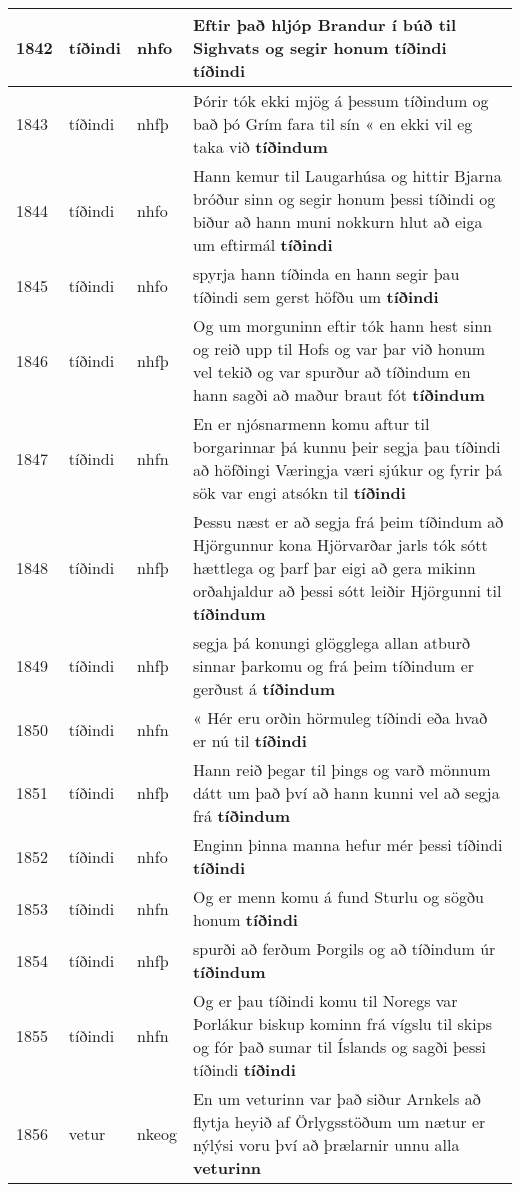 \documentclass{article}
\begin{document}
\begin{longtable}{p{1cm}|p{1cm}|p{1cm}|p{13cm}}
\hline
1842&tíðindi&nhfo&Eftir það hljóp Brandur í búð til Sighvats og segir honum tíðindi \textbf{tíðindi} \\
\hline
1843&tíðindi&nhfþ&Þórir tók ekki mjög á þessum tíðindum og bað þó Grím fara til sín « en ekki vil eg taka við \textbf{tíðindum} \\
\hline
1844&tíðindi&nhfo&Hann kemur til Laugarhúsa og hittir Bjarna bróður sinn og segir honum þessi tíðindi og biður að hann muni nokkurn hlut að eiga um eftirmál \textbf{tíðindi} \\
\hline
1845&tíðindi&nhfo&spyrja hann tíðinda en hann segir þau tíðindi sem gerst höfðu um \textbf{tíðindi} \\
\hline
1846&tíðindi&nhfþ&Og um morguninn eftir tók hann hest sinn og reið upp til Hofs og var þar við honum vel tekið og var spurður að tíðindum en hann sagði að maður braut fót \textbf{tíðindum} \\
\hline
1847&tíðindi&nhfn&En er njósnarmenn komu aftur til borgarinnar þá kunnu þeir segja þau tíðindi að höfðingi Væringja væri sjúkur og fyrir þá sök var engi atsókn til \textbf{tíðindi} \\
\hline
1848&tíðindi&nhfþ&Þessu næst er að segja frá þeim tíðindum að Hjörgunnur kona Hjörvarðar jarls tók sótt hættlega og þarf þar eigi að gera mikinn orðahjaldur að þessi sótt leiðir Hjörgunni til \textbf{tíðindum} \\
\hline
1849&tíðindi&nhfþ&segja þá konungi glögglega allan atburð sinnar þarkomu og frá þeim tíðindum er gerðust á \textbf{tíðindum} \\
\hline
1850&tíðindi&nhfn&« Hér eru orðin hörmuleg tíðindi eða hvað er nú til \textbf{tíðindi} \\
\hline
1851&tíðindi&nhfþ&Hann reið þegar til þings og varð mönnum dátt um það því að hann kunni vel að segja frá \textbf{tíðindum} \\
\hline
1852&tíðindi&nhfo&Enginn þinna manna hefur mér þessi tíðindi \textbf{tíðindi} \\
\hline
1853&tíðindi&nhfn&Og er menn komu á fund Sturlu og sögðu honum \textbf{tíðindi} \\
\hline
1854&tíðindi&nhfþ&spurði að ferðum Þorgils og að tíðindum úr \textbf{tíðindum} \\
\hline
1855&tíðindi&nhfn&Og er þau tíðindi komu til Noregs var Þorlákur biskup kominn frá vígslu til skips og fór það sumar til Íslands og sagði þessi tíðindi \textbf{tíðindi} \\
\hline
1856&vetur&nkeog&En um veturinn var það siður Arnkels að flytja heyið af Örlygsstöðum um nætur er nýlýsi voru því að þrælarnir unnu alla \textbf{veturinn} \\

\end{longtable}
\end{document}
